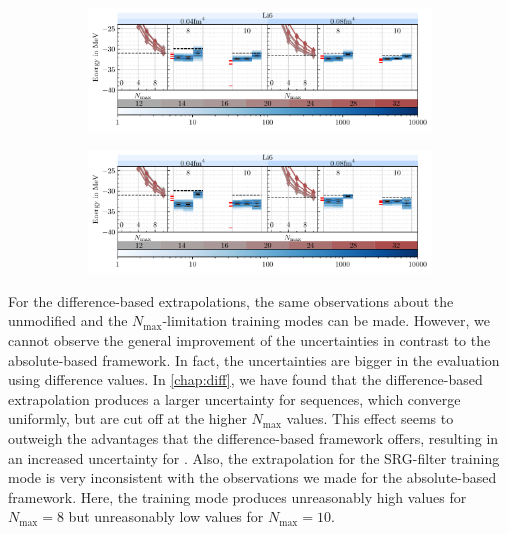 \begin{figure}[H]
  \caption{Evaluation results for the  nucleus using the absolute \textbf{(a)} and the difference-based extrapolation \textbf{(b)}. The shown training modes are, in order from left to right, the unmodified training mode for comparison, the $N_\mathrm{max}$-limitation training mode and the SRG-filter training mode. For each nucleus and each flow parameter, the NCSM sequences are shown on the left (the different frequencies are colored respectively to the legend, which shows the frequencies $\hbar\Omega$ in \si[]{\mega\electronvolt}) and the extrapolations for a given maximum $N_\mathrm{max}$ on the right. For each maximum $N_\mathrm{max}$, the variational boundary is shown as a dashed line, and the classical extrapolations are shown as red ticks.}

  \label{fig:eval_li6}
  \begin{subfigure}{\textwidth}
    \caption{}
    \includegraphics[width=\textwidth]{media/li6_evaluation_abs.pdf}
  \end{subfigure}
  \begin{subfigure}{\textwidth}
    \caption{}
    \includegraphics[width=\textwidth]{media/li6_evaluation_diff.pdf}
  \end{subfigure}
\end{figure}

For the difference-based extrapolations, the same observations about the unmodified and the $N_\mathrm{max}$-limitation training modes can be made. However, we cannot observe the general improvement of the uncertainties in contrast to the absolute-based framework. In fact, the uncertainties are bigger in the evaluation using difference values. In \autoref{chap:diff}, we have found that the difference-based extrapolation produces a larger uncertainty for sequences, which converge uniformly, but are cut off at the higher $N_\mathrm{max}$ values. This effect seems to outweigh the advantages that the difference-based framework offers, resulting in an increased uncertainty for . Also, the extrapolation for the SRG-filter training mode is very inconsistent with the observations we made for the absolute-based framework. Here, the training mode produces unreasonably high values for $N_\mathrm{max} = 8$ but unreasonably low values for $N_\mathrm{max} = 10$.
